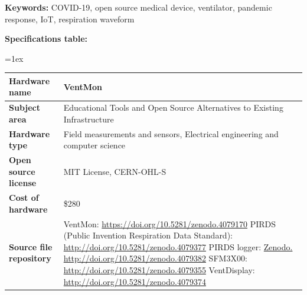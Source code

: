 \documentclass[11pt, letterpaper]{article}
\begin{document}
\begin{flushleft}
\textbf{Keywords:} COVID-19, open source medical device, ventilator, pandemic response, IoT, respiration waveform

\newpage
\textbf{Specifications table:}

\tabulinesep=1ex
\begin{tabu} to \linewidth {|X|X[3,l]|}
\hline  \textbf{Hardware name} &
  VentMon
  \\
  \hline \textbf{Subject area} & %
 Educational Tools and Open Source Alternatives to Existing Infrastructure
  \\
  \hline \textbf{Hardware type} &
Field measurements and sensors,
Electrical engineering and computer science
  \\
\hline \textbf{Open source license} &
 MIT License, CERN-OHL-S
  \\
\hline \textbf{Cost of hardware} &
\$280
  \\
  \hline \textbf{Source file repository} &

  VentMon: \linebreak
  \href{https://doi.org/10.5281/zenodo.4079170}{https://doi.org/10.5281/zenodo.4079170}
  \linebreak
  PIRDS (Public Invention Respiration Data Standard): \linebreak
  \href{http://doi.org/10.5281/zenodo.4079377}{http://doi.org/10.5281/zenodo.4079377}
  \linebreak
  PIRDS logger: \linebreak
  \href{Zenodo. http://doi.org/10.5281/zenodo.4079382}{Zenodo. http://doi.org/10.5281/zenodo.4079382}
  \linebreak
  SFM3X00: \linebreak
  \href{http://doi.org/10.5281/zenodo.4079355}{http://doi.org/10.5281/zenodo.4079355} \linebreak
  VentDisplay: \linebreak
  \href{http://doi.org/10.5281/zenodo.4079374}{http://doi.org/10.5281/zenodo.4079374} \linebreak
  \linebreak


\end{tabu}
\end{flushleft}
\end{document}
